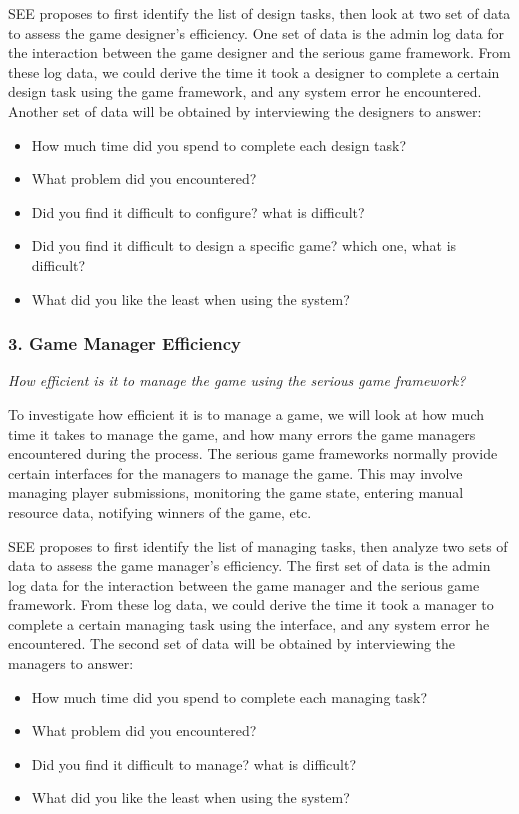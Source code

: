 \documentclass{sigchi}
\begin{document}
SEE proposes to first identify the list of design tasks, then look at
two set of data to assess the game designer's efficiency. One set of
data is the admin log data for the interaction between the game
designer and the serious game framework. From these log data, we could
derive the time it took a designer to complete a certain design task
using the game framework, and any system error he encountered. Another
set of data will be obtained by interviewing the designers to answer:
\begin{itemize}
    \item How much time did you spend to complete each design task?
    \item What problem did you encountered?
    \item Did you find it difficult to configure? what is difficult?
    \item Did you find it difficult to design a specific game? which
      one, what is difficult?
    \item What did you like the least when using the system?
\end{itemize}

\subsubsection{3. Game Manager Efficiency}

\emph{How efficient is it to manage the game using the serious game
  framework?}

To investigate how efficient it is to manage a game, we will look at
how much time it takes to manage the game, and how many errors the
game managers encountered during the process.  The serious game
frameworks normally provide certain interfaces for the managers to
manage the game. This may involve managing player submissions,
monitoring the game state, entering manual resource data, notifying
winners of the game, etc.

SEE proposes to first identify the list of managing tasks, then
analyze two sets of data to assess the game manager's efficiency. The
first set of data is the admin log data for the interaction between
the game manager and the serious game framework. From these log data,
we could derive the time it took a manager to complete a certain
managing task using the interface, and any system error he
encountered. The second set of data will be obtained by interviewing
the managers to answer:
\begin{itemize}
\item How much time did you spend to complete each managing task?
\item What problem did you encountered?
\item Did you find it difficult to manage? what is difficult?
\item What did you like the least when using the system?
\end{itemize}
\end{document}

